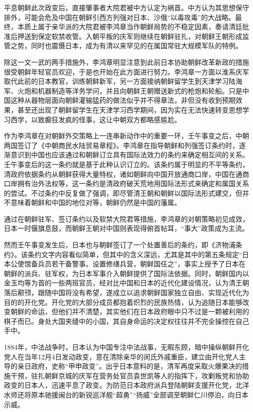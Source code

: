 \documentclass[12pt,UTF8]{ctexbook}
\begin{document}
平息朝鲜此次政变后，直接肇事者大院君被中方认定为祸首。中方认为其思想保守排外，可能会危及中国在朝鲜引西方列强对日本、沙俄“以毒攻毒”的大战略。最终，本质上属于亲华派的大院君被李鸿章当作朝鲜局势的不稳定因素，奏请清廷批准后押送到保定软禁收管。入朝平叛的庆军则继续在朝鲜驻扎，对朝鲜王朝形成监管之势，同时也震慑日本，成为有清以来罕见的在属国常驻大规模军队的特例。

除这一文一武的两手措施外，李鸿章明显注意到此前日本协助朝鲜改革新政的措施很受朝鲜年轻官员欢迎，于是也开始在此方面进行努力。李鸿章一方面以淮系庆军取代此前的日本教官，训练朝鲜新军，另一方面接纳朝鲜留学生到天津学习陆海军、火炮和机器制造等洋务学问，并且向朝鲜王朝赠送新式的枪炮和轮船。只是中国这种从器物层面向朝鲜灌输猛药的做法似乎并不得章法，非但没有收到预期效果，甚至还出现了朝鲜留学生在天津学习西学期间，因为实在无法快速转变思想学习西学，以致癫狂发疯的怪事，这让中朝双方都略感尴尬。

作为李鸿章在对朝鲜外交策略上一连串新动作中的重要一环，壬午事变之后，中朝两国签订了《中朝商民水陆贸易章程》。李鸿章在指导朝鲜和列强签订条约时，逐渐意识到中国也应该通过和朝鲜订立具有国际法效力的条约来确定相互间的关系。壬午事变后的这一条约就是基于此种认识订立的。该条约属于明显的不平等条约，清政府依据条约从朝鲜获得大量特权，诸如朝鲜向中国开放通商口岸，中国在通商口岸拥有治外法权等，这一条约是清政府破天荒地用国际法形式来确定和属国关系的尝试。不过条约中反复做了强调，即尽管清王朝和朝鲜以国际法形式建交，但并不意味着朝鲜和中国的地位对等，朝鲜仍然是中国的藩属。

通过在朝鲜驻军、签订条约以及软禁大院君等措施，李鸿章的对朝策略初见成效，日本一时偃旗息鼓，而朝鲜王朝对中国则表现得俯首帖耳，“事大”政策成为主流。

然而壬午事变发生后，日本也与朝鲜签订了一个处置善后的条约，即《济物浦条约》。该条约文字内容看似简单，但其中的含义深远，尤其是其中的第五条规定“日本公使馆备兵员若干备警事。设置修缮兵营，朝鲜国任之”，事实上授予了日本在朝鲜的派兵、驻军权，为日本军事介入朝鲜提供了国际法依据。同时，朝鲜国内以金玉均等为首的一些两班官员，经对比中国和日本的近代化建设情况，认为清王朝落后颟顸，跟随中国将没有希望，遂成立以追求朝鲜国家独立自由、实现近代化为目的的开化党。开化党的大部分成员都抱着炽烈的民族热情，认为追随日本能够改变朝鲜的命运，但他们并不清楚，其实他们在日本政府眼中只不过是一颗被利用的棋子而已。身处大国夹缝中的小国，其自身命运的决定权往往并不完全操控在自己手中。

1884年，中法战争时，日本认为中国专注中法战事，无暇东顾，暗中操纵朝鲜开化党人在当年12月4日发动政变，意在清除亲华的闵氏外戚重臣，建立由开化党人主导的亲日政府，史称“甲申政变”。出乎日本意料的是，清军再度采取火爆果决的措施干预，驻扎朝鲜京城的庆军在营务处官员袁世凯等人的指挥下，攻剿叛党和协助政变的日本人，迅速平息了政变。为防范日本政府派兵登陆朝鲜支援开化党，北洋水师还将原本驰援闽台的新锐巡洋舰“超勇”“扬威”全部调至朝鲜仁川停泊，向日本示威。
\end{document}
